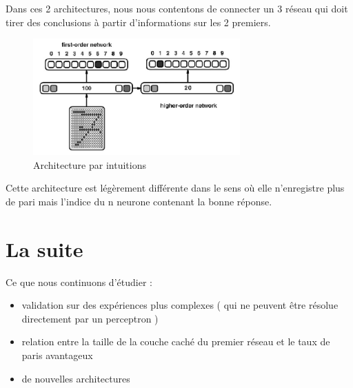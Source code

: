 \documentclass[a4paper,12pt]{article}
\begin{document}
Dans ces 2 architectures, nous nous contentons de connecter un 3 réseau qui doit 
tirer des conclusions à partir d'informations sur les 2 premiers.

\begin{figure}[h]
 \begin{center}
 \includegraphics[width=300px]{../pre-presentation/nth_wta.png}
\end{center}
\caption{Architecture par intuitions}
\end{figure}

Cette architecture est légèrement différente dans le sens où elle n'enregistre
plus de pari mais l'indice du n neurone contenant la bonne réponse.

\section{La suite}

Ce que nous continuons d'étudier : 
\begin{itemize}
 \item validation sur des expériences plus complexes ( qui ne peuvent être résolue directement par un perceptron )
 \item relation entre la taille de la couche caché du premier réseau et le taux de paris avantageux
 \item de nouvelles architectures
\end{itemize}
\end{document}
